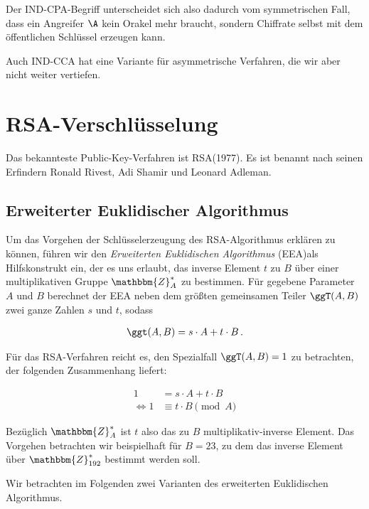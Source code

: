 Der IND-CPA-Begriff unterscheidet sich also dadurch vom symmetrischen
Fall, dass ein Angreifer $\A$ kein Orakel mehr braucht, sondern
Chiffrate selbst mit dem öffentlichen Schlüssel erzeugen kann.

Auch IND-CCA hat eine Variante für asymmetrische Verfahren, die wir aber
nicht weiter vertiefen.


\section{RSA-Verschlüsselung} Das bekannteste Public-Key-Verfahren ist
RSA\indexRSATextBook (1977). Es ist benannt nach seinen Erfindern
Ronald Rivest, Adi Shamir und Leonard Adleman.

\subsection{Erweiterter Euklidischer Algorithmus}
\label{ssec:eea} Um das Vorgehen der Schlüsselerzeugung des
RSA-Algorithmus erklären zu können, führen wir den \emph{Erweiterten
  Euklidischen Algorithmus} (EEA)\indexEEA als Hilfskonstrukt ein, der es
uns erlaubt, das inverse Element $t$ zu $B$ über einer multiplikativen
Gruppe $\mathbbm{Z}^{\ast}_{A}$ zu bestimmen. Für gegebene Parameter $A$
und $B$ berechnet der EEA neben dem größten gemeinsamen Teiler $\ggT(A,
B)$ zwei ganze Zahlen $s$ und $t$, sodass

\begin{align*} \ggt(A, B) = s \cdot A + t \cdot B\, .
\end{align*}

Für das RSA-Verfahren reicht es, den Spezialfall $\ggT(A,B) = 1$ zu
betrachten, der folgenden Zusammenhang liefert:

\begin{align*} 1 &= s \cdot A + t \cdot B\\ \Leftrightarrow 1 &\equiv t
                                                                \cdot B \pmod A
\end{align*}

Bezüglich $\mathbbm{Z}^*_{A}$ ist $t$ also das zu $B$
multiplikativ-inverse Element. Das Vorgehen betrachten wir beispielhaft
für $B = 23$, zu dem das inverse Element über $\mathbbm{Z}^{\ast}_{192}$
bestimmt werden soll.

Wir betrachten im Folgenden zwei Varianten des erweiterten Euklidischen
Algorithmus.

